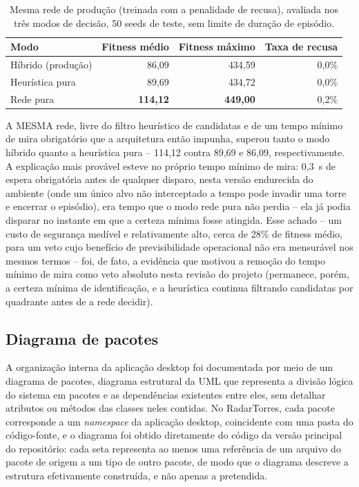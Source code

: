 \documentclass[12pt,a4paper]{article}
\begin{document}
\begin{table}[htbp]
  \centering
  \caption{Mesma rede de produção (treinada com a penalidade de recusa), avaliada nos três modos de
  decisão, 50 seeds de teste, sem limite de duração de episódio.}
  \label{tab:tres-modos-decisao}
  \small
  \begin{tabular}{lrrr}
    \hline
    \textbf{Modo} & \textbf{Fitness médio} & \textbf{Fitness máximo} & \textbf{Taxa de recusa} \\
    \hline
    Híbrido (produção) & 86,09 & 434,59 & 0,0\% \\
    Heurística pura & 89,69 & 434,72 & 0,0\% \\
    Rede pura & \textbf{114,12} & \textbf{449,00} & 0,2\% \\
    \hline
  \end{tabular}
\end{table}

A MESMA rede, livre do filtro heurístico de candidatas e de um tempo mínimo de mira obrigatório que
a arquitetura então impunha, superou tanto o modo híbrido quanto a heurística pura -- 114,12 contra
89,69 e 86,09, respectivamente. A explicação mais provável esteve no próprio tempo mínimo de mira:
0,3~s de espera obrigatória antes de qualquer disparo, nesta versão endurecida do ambiente (onde um
único alvo não interceptado a tempo pode invadir uma torre e encerrar o episódio), era tempo que o
modo rede pura não perdia -- ela já podia disparar no instante em que a certeza mínima fosse
atingida. Esse achado -- um custo de segurança medível e relativamente alto, cerca de 28\% de
fitness médio, para um veto cujo benefício de previsibilidade operacional não era mensurável nos
mesmos termos -- foi, de fato, a evidência que motivou a remoção do tempo mínimo de mira como veto
absoluto nesta revisão do projeto (permanece, porém, a certeza mínima de identificação, e a
heurística continua filtrando candidatas por quadrante antes de a rede decidir).

\subsection{Diagrama de pacotes}

A organização interna da aplicação desktop foi documentada por meio de um diagrama de pacotes,
diagrama estrutural da UML que representa a divisão lógica do sistema em pacotes e as
dependências existentes entre eles, sem detalhar atributos ou métodos das classes neles contidas.
No RadarTorres, cada pacote corresponde a um \textit{namespace} da aplicação desktop, coincidente
com uma pasta do código-fonte, e o diagrama foi obtido diretamente do código da versão principal do
repositório: cada seta representa ao menos uma referência de um arquivo do pacote de origem a um
tipo de outro pacote, de modo que o diagrama descreve a estrutura efetivamente construída, e não
apenas a pretendida.
\end{document}
